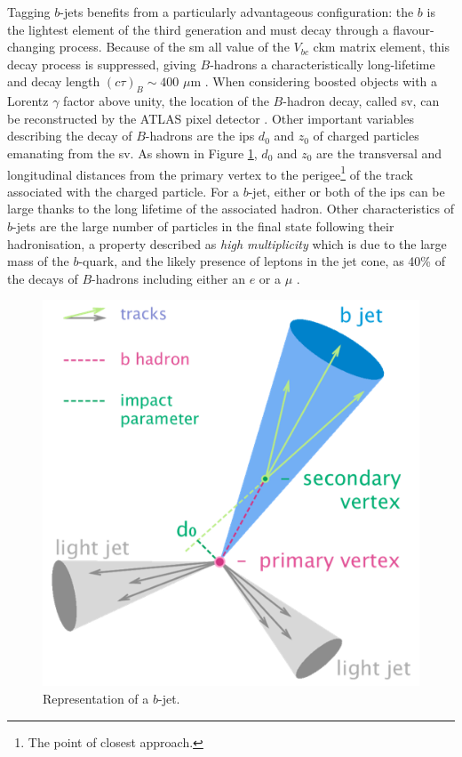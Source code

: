 Tagging $b$-jets benefits from a particularly advantageous configuration:  the $b$ is the lightest element of the third generation and must decay through a flavour-changing process. Because of the \gls{sm} all value of the $V_{bc}$ \gls{ckm} matrix element, this decay process is suppressed, giving $B$-hadrons a characteristically long-lifetime and decay length $(c\tau)_{B} \sim 400$  $\mu$m \cite{Tanabashi:2018oca}. When considering boosted objects with a Lorentz $\gamma$ factor above unity, the location of the $B$-hadron decay, called  \gls{sv}, can be reconstructed by the ATLAS pixel detector \cite{Aad:2019aic}. Other important variables describing the decay of $B$-hadrons are the \glspl{ip} $d_0$ and $z_0$ of charged particles emanating from the \gls{sv}. As shown in Figure \ref{fig:bjet}, $d_0$ and $z_0$ are the transversal and longitudinal distances from the primary vertex to the perigee\footnote{The point of closest approach.} of the track associated with the charged particle. For a $b$-jet, either or both of the \glspl{ip} can be large thanks to the long lifetime of the associated hadron. Other characteristics of $b$-jets are the large number of particles in the final state following their hadronisation, a property described as \textit{high multiplicity} which is due to the large mass of the $b$-quark, and the likely presence of leptons in the jet cone, as 40\% of the decays of $B$-hadrons including either an $e$ or a $\mu$ \cite{Tanabashi:2018oca}. \\

\begin{figure}[h!]
\center
\includegraphics[scale=0.6]{Images/bjet}
\caption{Representation of a $b$-jet.} 
\label{fig:bjet}
\end{figure}

